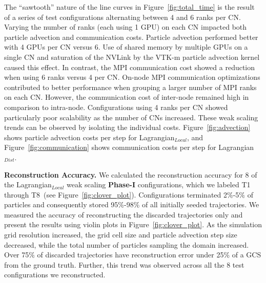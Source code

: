 %
%
The ``sawtooth'' nature of the line curves in Figure~\ref{fig:total_time} is the result of a series of test configurations alternating between 4 and 6 ranks per CN.
%
Varying the number of ranks (each using 1 GPU) on each CN impacted both particle advection and communication costs.
%
%
%
%
Particle advection performed better with 4 GPUs per CN versus 6.
%
Use of shared memory by multiple GPUs on a single CN and saturation of the NVLink by the VTK-m particle advection kernel caused this effect.
%
%
%
In contrast, the MPI communication cost showed a reduction when using 6 ranks versus 4 per CN. 
%
%
On-node MPI communication optimizations contributed to better performance when grouping a larger number of MPI ranks on each CN. 
%
However, the communication cost of inter-node remained high in comparison to intra-node.
%
Configurations using 4 ranks per CN showed particularly poor scalability as the number of CNs increased.
%
%
These weak scaling trends can be observed by isolating the individual costs. 
%
Figure~\ref{fig:advection} shows particle advection costs per step for Lagrangian$_{Local}$, and Figure~\ref{fig:communication} shows communication costs per step for Lagrangian$_{Dist}$. 

\textbf{Reconstruction Accuracy.}
We calculated the reconstruction accuracy for 8 of the Lagrangian$_{Local}$ weak scaling \textbf{Phase-I} configurations, which we labeled T1 through T8~(see Figure~\ref{fig:clover_plot}). 
%
Configurations terminated 2\%-5\% of particles and consequently stored 95\%-98\% of all initially seeded trajectories. 
%
We measured the accuracy of reconstructing the discarded trajectories only and present the results using violin plots in Figure~\ref{fig:clover_plot}.
%
As the simulation grid resolution increased, the grid cell size and particle advection step size decreased, while the total number of particles sampling the domain increased. 
%
Over 75\% of discarded trajectories have reconstruction error under 25\% of a GCS from the ground truth.
%
Further, this trend was observed across all the 8 test configurations we reconstructed. 

